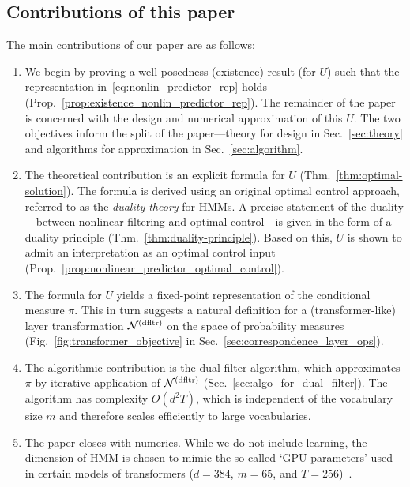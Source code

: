 \documentclass[twoside,11pt]{article}
\def\Sec#1{Sec.~\ref{#1}}
\def\Fig#1{Fig.~\ref{#1}}
\def\Sec#1{Sec.~\ref{#1}}
\def\Sec#1{Sec~\ref{#1}}
\def\Fig#1{Fig.~\ref{#1}}
\def\Sec#1{Sec.~\ref{#1}}
\def\Sec#1{Sec.~\ref{#1}}
\def\Thm#1{Thm.~\ref{#1}}
\def\Prop#1{Prop.~\ref{#1}}
\def\dfltr{{\text{\rm (dfltr)}}}
\begin{document}
\subsection{Contributions of this paper}

The main contributions of our paper are as follows:
\begin{enumerate}
  \item We begin by proving a well-posedness (existence) result (for $U$) such that the
  representation in~\eqref{eq:nonlin_predictor_rep} holds (\Prop{prop:existence_nonlin_predictor_rep}).  
  The remainder of the paper is concerned with the design and numerical approximation of this $U$.  
  The two objectives inform the split of the paper---theory for design in \Sec{sec:theory} and algorithms for approximation in \Sec{sec:algorithm}. 

  \item The theoretical contribution is an explicit formula for $U$ (\Thm{thm:optimal-solution}). 
  The formula is derived using an original optimal control approach, referred to as the {\em duality theory} for HMMs. 
  A precise statement of the duality---between nonlinear filtering and optimal control---is given in the form of a duality principle (\Thm{thm:duality-principle}).
  Based on this, $U$ is shown to admit an interpretation as an optimal control input (\Prop{prop:nonlinear_predictor_optimal_control}).  
  
  \item The formula for $U$ yields a fixed-point representation of the 
conditional measure $\pi$. This in turn suggests a natural definition 
for a (transformer-like) layer transformation ${\cal N}^\dfltr$ on the space of 
probability measures (\Fig{fig:transformer_objective} in 
\Sec{sec:correspondence_layer_ops}).
 

\item The algorithmic contribution is the dual filter algorithm, which 
approximates $\pi$ by iterative application of ${\cal N}^\dfltr$ 
(\Sec{sec:algo_for_dual_filter}). The algorithm has complexity $O(d^2T)$, 
which is independent of the vocabulary size $m$ and therefore scales 
efficiently to large vocabularies.
   
  \item The paper closes with numerics. 
  While we do not include learning, the dimension of HMM is chosen to mimic the so-called `GPU parameters' used in certain models of transformers ($d=384$, $m=65$, and $T=256$)~\citep{Karpathy2022}.
\end{enumerate}
\end{document}
